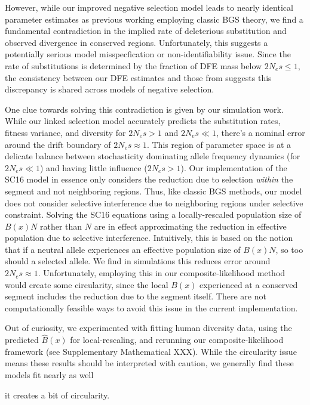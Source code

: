 \documentclass[11pt]{article}
\begin{document}
However, while our improved negative selection model leads to nearly identical
parameter estimates as previous working employing classic BGS theory, we find a
fundamental contradiction in the implied rate of deleterious substitution and
observed divergence in conserved regions. Unfortunately, this suggests a
potentially serious model misspecfication or non-identifiability issue. Since
the rate of substitutions is determined by the fraction of DFE mass below $2N_e
s \le 1$, the consistency between our DFE estimates and those from
\textcite{Murphy2022-sj} suggests this discrepancy is shared across models of
negative selection.

One clue towards solving this contradiction is given by our simulation work.
While our linked selection model accurately predicts the substitution rates,
fitness variance, and diversity for $2N_e s > 1$ and $2N_e s \ll 1$, there's a
nominal error around the drift boundary of $2N_e s \approx 1$. This region of
parameter space is at a delicate balance between stochasticity dominating
allele frequency dynamics (for $2N_e s \ll 1$) and having little influence
($2N_e s > 1$). Our implementation of the SC16 model in essence only considers
the reduction due to selection \emph{within} the segment and not neighboring
regions. Thus, like classic BGS methods, our model does not consider selective
interference due to neighboring regions under selective constraint. Solving the
SC16 equations using a locally-rescaled population size of $B(x) N$ rather than
$N$ are in effect approximating the reduction in effective population due to
selective interference. Intuitively, this is based on the notion that if a
neutral allele experiences an effective population size of $B(x)N$, so too
should a selected allele. We find in simulations this reduces error around $2
N_e s \approx 1$. Unfortunately, employing this in our composite-likelihood
method would create some circularity, since the local $B(x)$ experienced at a
conserved segment includes the reduction due to the segment itself. There are
not computationally feasible ways to avoid this issue in the current
implementation.

Out of curiosity, we experimented with fitting human diversity data, using the
predicted $\widehat{B}(x)$ for local-rescaling, and rerunning our
composite-likelihood framework (see Supplementary Mathematical XXX). While the
circularity issue means these results should be interpreted with caution, we
generally find these models fit nearly as well 

it creates a bit of circularity. 
\end{document}
